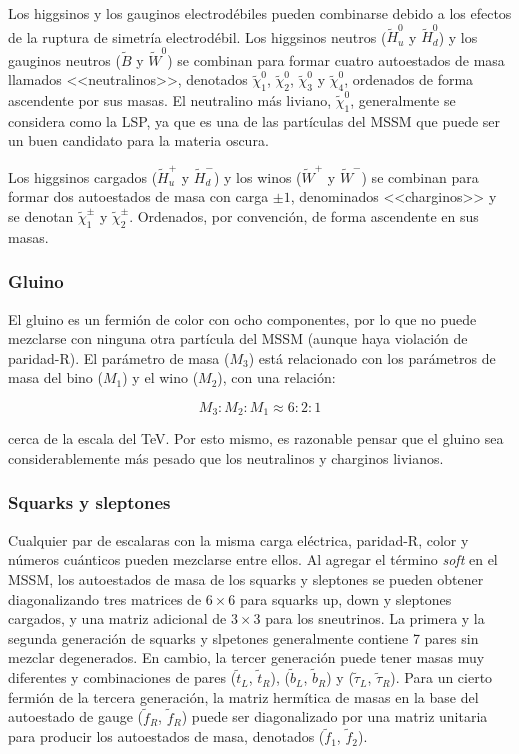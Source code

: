 Los higgsinos y los gauginos electrodébiles pueden combinarse debido a los efectos de la ruptura de simetría electrodébil. Los higgsinos neutros ($\widetilde{H}^{0}_{u}$ y $\widetilde{H}^{0}_{d}$) y los gauginos neutros ($\widetilde{B}$ y $\widetilde{W}^{0}$) se combinan para formar cuatro autoestados de masa llamados <<neutralinos>>, denotados $\widetilde{\chi}^{0}_{1}$, $\widetilde{\chi}^{0}_{2}$, $\widetilde{\chi}^{0}_{3}$ y $\widetilde{\chi}^{0}_{4}$, ordenados de forma ascendente por sus masas. El neutralino más liviano, $\widetilde{\chi}^{0}_{1}$, generalmente se considera como la LSP, ya que es una de las partículas del MSSM que puede ser un buen candidato para la materia oscura. 

Los higgsinos cargados ($\widetilde{H}^{+}_{u}$ y $\widetilde{H}^{-}_{d}$) y los winos ($\widetilde{W}^{+}$ y $\widetilde{W}^{-}$) se combinan para formar dos autoestados de masa con carga $\pm1$, denominados <<charginos>> y se denotan $\widetilde{\chi}^{\pm}_{1}$ y $\widetilde{\chi}^{\pm}_{2}$. Ordenados, por convención, de forma ascendente en sus masas.


\subsubsection{Gluino}

El gluino es un fermión de color con ocho componentes, por lo que no puede mezclarse con ninguna otra partícula del MSSM (aunque haya violación de paridad-R). El parámetro de masa ($M_{3}$) está relacionado con los parámetros de masa del bino ($M_{1}$) y el wino ($M_{2}$), con una relación:

\begin{equation}
M_{3}:M_{2}:M_{1} \approx 6:2:1
\end{equation}

\noindent
cerca de la escala del TeV. Por esto mismo, es razonable pensar que el gluino sea considerablemente más pesado que los neutralinos y charginos livianos.


\subsubsection{Squarks y sleptones}

Cualquier par de escalaras con la misma carga eléctrica, paridad-R, color y números cuánticos pueden mezclarse entre ellos. Al agregar el término \textit{soft} en el MSSM, los autoestados de masa de los squarks y sleptones se pueden obtener diagonalizando tres matrices de $6 \times 6$ para squarks up, down y sleptones cargados, y una matriz adicional de $3 \times 3$ para los sneutrinos. La primera y la segunda generación de squarks y slpetones generalmente contiene 7 pares sin mezclar degenerados. En cambio, la tercer generación puede tener masas muy diferentes y combinaciones de pares ($\tilde{t}_{L}$, $\tilde{t}_{R}$), ($\tilde{b}_{L}$, $\tilde{b}_{R}$) y ($\tilde{\tau}_{L}$, $\tilde{\tau}_{R}$). Para un cierto fermión de la tercera generación, la matriz hermítica de masas en la base del autoestado de gauge ($\tilde{f}_{R}$, $\tilde{f}_{R}$) puede ser diagonalizado por una matriz unitaria para producir los autoestados de masa, denotados ($\tilde{f}_{1}$, $\tilde{f}_{2}$).

